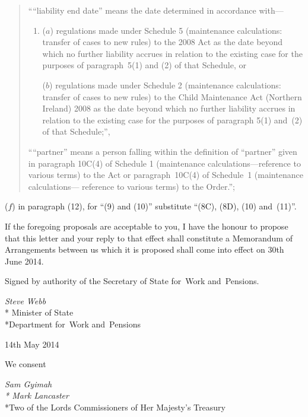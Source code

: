\documentclass[12pt,a4paper]{article}
\begin{document}
\begin{enumerate}
\begin{enumerate}
\begin{quotation}
````liability end date'' means the date determined in accordance with---
\begin{enumerate}\item[]
($a$) regulations made under Schedule 5 (maintenance calculations: transfer
of cases to new rules) to the 2008 Act as the date beyond which no 
further liability accrues in relation to the existing case for the purposes
of paragraph~5(1) and (2) of that Schedule, or

($b$) regulations made under Schedule 2 (maintenance calculations: transfer
of cases to new rules) to the Child Maintenance Act (Northern Ireland)
2008 as the date beyond which no further liability accrues in relation to
the existing case for the purposes of paragraph 5(1) and~(2) of that
Schedule;'',
\end{enumerate}

````partner'' means a person falling within the definition of ``partner'' given in 
paragraph 10C(4) of Schedule 1 (maintenance calculations---reference to various
terms) to the Act or paragraph~10C(4) of Schedule~1 (maintenance calculations---%
reference to various terms) to the Order.'';
\end{quotation}
\end{enumerate}

($f$) in paragraph (12), for ``(9) and (10)'' substitute ``(8C), (8D), (10) and~(11)''.
\end{enumerate}

If the foregoing proposals are acceptable to you, I have the honour to propose that this 
letter and your reply to that effect shall constitute a Memorandum of Arrangements
between us which it is proposed shall come into effect on 30th June 2014.

\bigskip

\pagebreak[3]

Signed 
by authority of the 
Secretary of State for~Work and~Pensions.

{\raggedleft
\emph{Steve Webb}\\*
Minister
of State\\*Department 
for~Work and~Pensions

}

14th May 2014

\bigskip

\pagebreak[3]

We consent

{\raggedleft
\emph{Sam Gyimah\\*
Mark Lancaster}\\*Two of the Lords Commissioners of Her Majesty's Treasury

}
\end{document}
